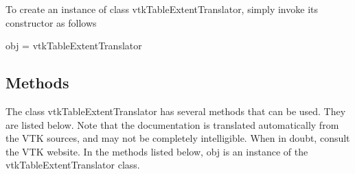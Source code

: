 To create an instance of class vtk\-Table\-Extent\-Translator, simply invoke its constructor as follows \begin{DoxyVerb}  obj = vtkTableExtentTranslator
\end{DoxyVerb}
 \hypertarget{vtkwidgets_vtkxyplotwidget_Methods}{}\subsection{Methods}\label{vtkwidgets_vtkxyplotwidget_Methods}
The class vtk\-Table\-Extent\-Translator has several methods that can be used. They are listed below. Note that the documentation is translated automatically from the V\-T\-K sources, and may not be completely intelligible. When in doubt, consult the V\-T\-K website. In the methods listed below, {\ttfamily obj} is an instance of the vtk\-Table\-Extent\-Translator class. 
